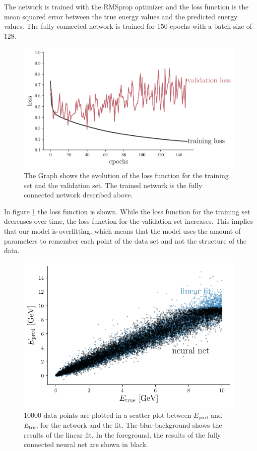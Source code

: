 \documentclass[12pt, a4paper]{thesis}
\begin{document}
The network is trained with the RMSprop optimizer and the loss
function is the mean squared error between the true energy values and
the predicted energy values. The fully connected network is trained
for 150 epochs with a batch size of 128.

\begin{figure}[hbtp]
  \centering
  \includegraphics[width=.9\linewidth]{../images/dense_loss.pdf}
  \caption{The Graph shows the evolution of the loss function for the
    training set and the validation set. The trained network is the
    fully connected network described above.}
  \label{dense_loss}
\end{figure}


In figure \ref{dense_loss} the loss function is shown. While the loss
function for the training set decreases over time, the loss function
for the validation set increases. This implies that our model is
overfitting, which means that the model uses the amount of parameters
to remember each point of the data set and not the structure of the
data.

\begin{figure}[hbtp]
  \centering
  \includegraphics[width=.9\linewidth]{../images/dense_scatter.pdf}
  \caption{ 10000 data points are plotted in a scatter plot between
    \(E_\text{pred}\) and \(E_{\text{true}}\) for the network and the
    fit. The blue background shows the results of the linear fit. In
    the foreground, the results of the fully connected neural net are
    shown in black.}
  \label{dense_scatter}
\end{figure} 
\end{document}
